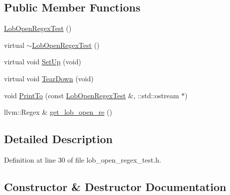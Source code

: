 \subsection*{Public Member Functions}
\begin{DoxyCompactItemize}
\item 
\hyperlink{classclang_1_1tidy_1_1pagesjaunes_1_1test_1_1_lob_open_regex_test_a8267a1adaa21d37025e98a0a8ae87ad6}{Lob\+Open\+Regex\+Test} ()
\item 
virtual \hyperlink{classclang_1_1tidy_1_1pagesjaunes_1_1test_1_1_lob_open_regex_test_a6db3dbdee74fedd7e1c874ea3eefb66c}{$\sim$\+Lob\+Open\+Regex\+Test} ()
\item 
virtual void \hyperlink{classclang_1_1tidy_1_1pagesjaunes_1_1test_1_1_lob_open_regex_test_a28160c083fe738f04e533a3cb7d671e6}{Set\+Up} (void)
\item 
virtual void \hyperlink{classclang_1_1tidy_1_1pagesjaunes_1_1test_1_1_lob_open_regex_test_a931d786126fbeba5785ac94925c37ffc}{Tear\+Down} (void)
\item 
void \hyperlink{classclang_1_1tidy_1_1pagesjaunes_1_1test_1_1_lob_open_regex_test_a81edd389a0f8214a5b8f2f188c175bfd}{Print\+To} (const \hyperlink{classclang_1_1tidy_1_1pagesjaunes_1_1test_1_1_lob_open_regex_test}{Lob\+Open\+Regex\+Test} \&, \+::std\+::ostream $\ast$)
\item 
llvm\+::\+Regex \& \hyperlink{classclang_1_1tidy_1_1pagesjaunes_1_1test_1_1_lob_open_regex_test_a7844f9ac141e0a257597bb6e44a169a3}{get\+\_\+lob\+\_\+open\+\_\+re} ()
\end{DoxyCompactItemize}


\subsection{Detailed Description}


Definition at line 30 of file lob\+\_\+open\+\_\+regex\+\_\+test.\+h.



\subsection{Constructor \& Destructor Documentation}
\mbox{\label{classclang_1_1tidy_1_1pagesjaunes_1_1test_1_1_lob_open_regex_test_a8267a1adaa21d37025e98a0a8ae87ad6}} 
